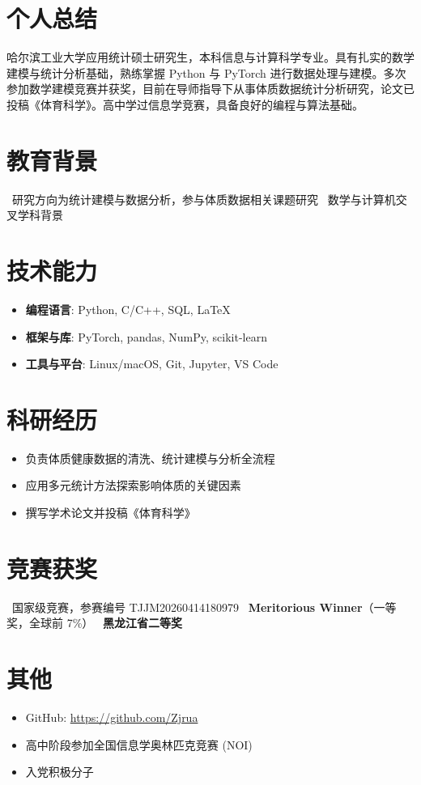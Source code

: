 \documentclass{resume}
\begin{document}


 
\section{个人总结}
哈尔滨工业大学应用统计硕士研究生，本科信息与计算科学专业。具有扎实的数学建模与统计分析基础，熟练掌握 Python 与 PyTorch 进行数据处理与建模。多次参加数学建模竞赛并获奖，目前在导师指导下从事体质数据统计分析研究，论文已投稿《体育科学》。高中学过信息学竞赛，具备良好的编程与算法基础。

\section{教育背景}
\ 研究方向为统计建模与数据分析，参与体质数据相关课题研究
\ 数学与计算机交叉学科背景

\section{技术能力}
\begin{itemize}[parsep=0.2ex]
  \item \textbf{编程语言}: Python, C/C++, SQL, LaTeX
  \item \textbf{框架与库}: PyTorch, pandas, NumPy, scikit-learn
  \item \textbf{工具与平台}: Linux/macOS, Git, Jupyter, VS Code
\end{itemize}

\section{科研经历}
\begin{itemize}
  \item 负责体质健康数据的清洗、统计建模与分析全流程
  \item 应用多元统计方法探索影响体质的关键因素
  \item 撰写学术论文并投稿《体育科学》
\end{itemize}

\section{竞赛获奖}
\ 国家级竞赛，参赛编号 TJJM20260414180979
\ \textbf{Meritorious Winner}（一等奖，全球前 7\%）
\ \textbf{黑龙江省二等奖}

\section{其他}
\begin{itemize}[parsep=0.2ex]
  \item GitHub: \href{https://github.com/Zjrua}{https://github.com/Zjrua}
  \item 高中阶段参加全国信息学奥林匹克竞赛 (NOI)
  \item 入党积极分子
\end{itemize}
\end{document}
